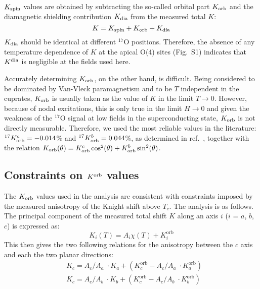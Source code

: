 \documentclass[superscriptaddress,twocolumn,prl,preprintnumbers,amsmath,amssymb]{revtex4}
\begin{document}
$K_{\rm spin}$ values are obtained by subtracting the so-called orbital part $K_{\rm orb}$ and the diamagnetic shielding contribution $K_{\rm dia}$ from the measured total $K$:
\begin{equation}
K = K_{\rm spin} + K_{\rm orb} + K_{\rm dia}
\end{equation}
$K_{\rm dia}$ should be identical at different $^{17}$O positions. Therefore, the absence of any temperature dependence of $K$ at the apical O(4) sites (Fig.~S1) indicates that $K^{\rm dia}$ is negligible at the fields used here.





Accurately determining $K_{\rm orb}$, on the other hand, is difficult. Being considered to be dominated by Van-Vleck paramagnetism and to be $T$ independent in the cuprates, $K_{\rm orb}$ is usually taken as the value of $K$ in the limit $T\rightarrow 0$. However, because of nodal excitations, this is only true in the limit $H\rightarrow 0$ and given the weakness of the $^{17}$O signal at low fields in the superconducting state, $K_{\rm orb}$ is not directly measurable. Therefore, we used the most reliable values in the literature: $^{17}K^{c}_{\rm orb}=-0.014$\% and $^{17}K^{b}_{\rm orb}=0.044$\%, as determined in ref.~\cite{Takigawa89}, together with the relation $K_{\rm orb}(\theta)=K^c_{\rm orb} \cos^2(\theta)+K^b_{\rm orb} \sin^2(\theta)$.



\subsection{\bf Constraints on $K^{\rm orb}$ values}

The $K_{\rm orb}$ values used in the analysis are consistent with constraints imposed by the measured anisotropy of the Knight shift above $T_c$. The analysis is as follows. The principal component of the measured total shift $K$ along an axis $i$ ($i$ = $a$, $b$, $c$) is expressed as:
\begin{equation}
\label{f1}
K_{i}\left( T \right)={{A}_{i}}\chi (T)+K_{i}^{\text{orb}}
\end{equation}
This then gives the two following relations for the anisotropy between the $c$ axis and each the two planar directions:
\begin{equation}
\label{f1}
\begin{aligned}
  & K_{c}={{{A}_{c}}}/{{{A}_{a}}}\;\cdot K_{a}+\left( K_{c}^{\text{orb}}-{{{A}_{c}}}/{{{A}_{a}}}\;\cdot K_{a}^{\text{orb}} \right) \\
 & K_{c}={{{A}_{c}}}/{{{A}_{b}}}\;\cdot K_{b}+\left( K_{c}^{\text{orb}}-{{{A}_{c}}}/{{{A}_{b}}}\;\cdot K_{b}^{\text{orb}} \right) \\
\end{aligned}
\end{equation}
\end{document}
